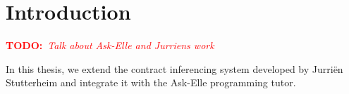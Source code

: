 \documentclass[10pt]{report}
\newcommand{\annotate}[3]{
	\begin{scriptsize}
	\textcolor{#1}{\textbf{#2}~\textit{#3}}
	\end{scriptsize}\newline}
\newcommand{\todo}[1]{\annotate{red} {TODO:} {#1}}
\begin{document}

\tableofcontents

\chapter{Introduction}
\todo{Talk about Ask-Elle and Jurriens work}
In this thesis, we extend the contract inferencing system developed by Jurri\"en Stutterheim and integrate it with the Ask-Elle programming tutor.
\end{document}
